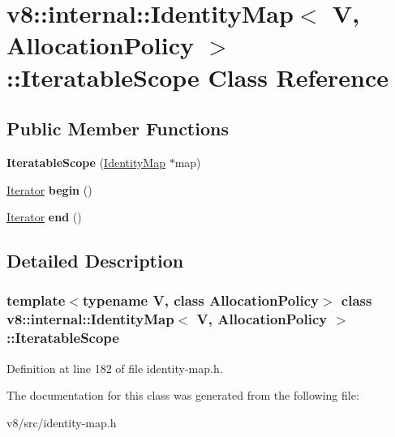 \hypertarget{classv8_1_1internal_1_1IdentityMap_1_1IteratableScope}{}\section{v8\+:\+:internal\+:\+:Identity\+Map$<$ V, Allocation\+Policy $>$\+:\+:Iteratable\+Scope Class Reference}
\label{classv8_1_1internal_1_1IdentityMap_1_1IteratableScope}
\subsection*{Public Member Functions}
\begin{DoxyCompactItemize}
\item 
\mbox{\label{classv8_1_1internal_1_1IdentityMap_1_1IteratableScope_ad7febc740254e1beb1b29663276b62da}} 
{\bfseries Iteratable\+Scope} (\mbox{\hyperlink{classv8_1_1internal_1_1IdentityMap}{Identity\+Map}} $\ast$map)
\item 
\mbox{\label{classv8_1_1internal_1_1IdentityMap_1_1IteratableScope_acbce41aa371014e869c9425170c0c019}} 
\mbox{\hyperlink{classv8_1_1internal_1_1IdentityMap_1_1Iterator}{Iterator}} {\bfseries begin} ()
\item 
\mbox{\label{classv8_1_1internal_1_1IdentityMap_1_1IteratableScope_a2f4f5ac5cd83534857f06660a462ef7d}} 
\mbox{\hyperlink{classv8_1_1internal_1_1IdentityMap_1_1Iterator}{Iterator}} {\bfseries end} ()
\end{DoxyCompactItemize}


\subsection{Detailed Description}
\subsubsection*{template$<$typename V, class Allocation\+Policy$>$\newline
class v8\+::internal\+::\+Identity\+Map$<$ V, Allocation\+Policy $>$\+::\+Iteratable\+Scope}



Definition at line 182 of file identity-\/map.\+h.



The documentation for this class was generated from the following file\+:\begin{DoxyCompactItemize}
\item 
v8/src/identity-\/map.\+h\end{DoxyCompactItemize}
